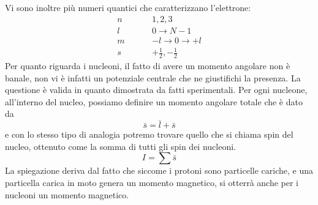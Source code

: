 Vi sono inoltre più numeri quantici che caratterizzano l'elettrone:
\begin{equation}
\begin{split}
n\hspace{1cm} & 1, 2,3\\
l\hspace{1cm} & 0\to N-1\\
m\hspace{1cm} & -l\to0\to+l\\
s\hspace{1cm} & +\frac{1}{2}, -\frac{1}{2}
\end{split}
\end{equation}
Per quanto riguarda i nucleoni, il fatto di avere un momento angolare non è banale, non vi è infatti un potenziale centrale che ne giustifichi la presenza.
La questione è valida in quanto dimostrata da fatti sperimentali.
Per ogni nucleone, all'interno del nucleo, possiamo definire un momento angolare totale che è dato da 
\begin{equation}
\bar s =\bar l + \bar s
\end{equation}
e con lo stesso tipo di analogia potremo trovare quello che si chiama spin del nucleo, ottenuto come la somma di tutti gli spin dei nucleoni.
\begin{equation}
I=\sum \bar s
\end{equation}
La spiegazione deriva dal fatto che siccome i protoni sono particelle cariche, e una particella carica in moto genera un momento magnetico, si otterrà anche per i nucleoni un momento magnetico.

